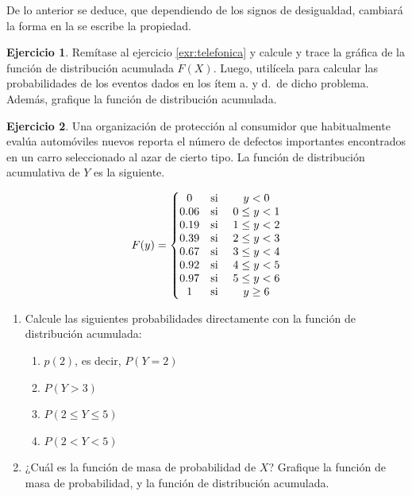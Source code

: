 \documentclass[
  11pt,
]{book}
\providecommand{\tightlist}{%
  \setlength{\itemsep}{0pt}\setlength{\parskip}{0pt}}
\theoremstyle{definition}
\theoremstyle{definition}
\theoremstyle{definition}
\newtheorem{exercise}{Ejercicio}[chapter]
\theoremstyle{definition}
\theoremstyle{remark}
\begin{document}
De lo anterior se deduce, que dependiendo de los signos de desigualdad, cambiará la forma en la se escribe la propiedad.

\begin{exercise}
Remítase al ejercicio \ref{exr:telefonica} y calcule y trace la gráfica de la función de distribución acumulada \(F(X)\). Luego, utilícela para calcular las probabilidades de los eventos dados en los ítem a. y d.~de dicho problema. Además, grafique la función de distribución acumulada.
\end{exercise}

\begin{exercise}

Una organización de protección al consumidor que habitualmente evalúa automóviles nuevos reporta el número de defectos importantes encontrados en un carro seleccionado al azar de cierto tipo. La función de distribución acumulativa de \(Y\) es la siguiente.

\begin{equation}
\notag
\begin{split}
F(y) = \left\lbrace
\begin{matrix}
0 & \text{si } & y < 0\\
0.06 & \text{si } & 0\leq y < 1\\
0.19 & \text{si } &  1\leq y < 2\\
0.39 & \text{si } & 2\leq y < 3\\
0.67 & \text{si } & 3\leq y < 4\\
0.92 & \text{si } & 4\leq y < 5\\
0.97 & \text{si } & 5\leq y < 6\\
1 & \text{si } & y\geq 6\\
\end{matrix}
\right.
\end{split}
\end{equation}

\begin{enumerate}
\def\labelenumi{\arabic{enumi}.}
\item
  Calcule las siguientes probabilidades directamente con la función de distribución acumulada:

  \begin{enumerate}
  \def\labelenumii{\alph{enumii}.}
  \tightlist
  \item
    \(p(2)\), es decir, \(P(Y=2)\)
  \item
    \(P(Y>3)\)
  \item
    \(P(2\leq Y\leq 5)\)
  \item
    \(P(2 < Y < 5)\)
  \end{enumerate}
\item
  ¿Cuál es la función de masa de probabilidad de \(X\)? Grafique la función de masa de probabilidad, y la función de distribución acumulada.
\end{enumerate}

\end{exercise}
\end{document}
